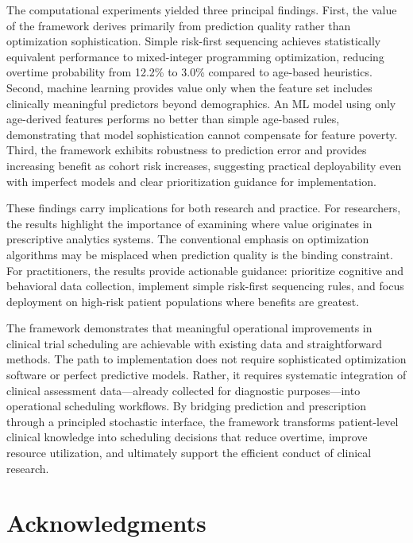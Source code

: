 The computational experiments yielded three principal findings. First, the value of the framework derives primarily from prediction quality rather than optimization sophistication. Simple risk-first sequencing achieves statistically equivalent performance to mixed-integer programming optimization, reducing overtime probability from 12.2\% to 3.0\% compared to age-based heuristics. Second, machine learning provides value only when the feature set includes clinically meaningful predictors beyond demographics. An ML model using only age-derived features performs no better than simple age-based rules, demonstrating that model sophistication cannot compensate for feature poverty. Third, the framework exhibits robustness to prediction error and provides increasing benefit as cohort risk increases, suggesting practical deployability even with imperfect models and clear prioritization guidance for implementation.

These findings carry implications for both research and practice. For researchers, the results highlight the importance of examining where value originates in prescriptive analytics systems. The conventional emphasis on optimization algorithms may be misplaced when prediction quality is the binding constraint. For practitioners, the results provide actionable guidance: prioritize cognitive and behavioral data collection, implement simple risk-first sequencing rules, and focus deployment on high-risk patient populations where benefits are greatest.

The framework demonstrates that meaningful operational improvements in clinical trial scheduling are achievable with existing data and straightforward methods. The path to implementation does not require sophisticated optimization software or perfect predictive models. Rather, it requires systematic integration of clinical assessment data---already collected for diagnostic purposes---into operational scheduling workflows. By bridging prediction and prescription through a principled stochastic interface, the framework transforms patient-level clinical knowledge into scheduling decisions that reduce overtime, improve resource utilization, and ultimately support the efficient conduct of clinical research.



\section*{Acknowledgments}

